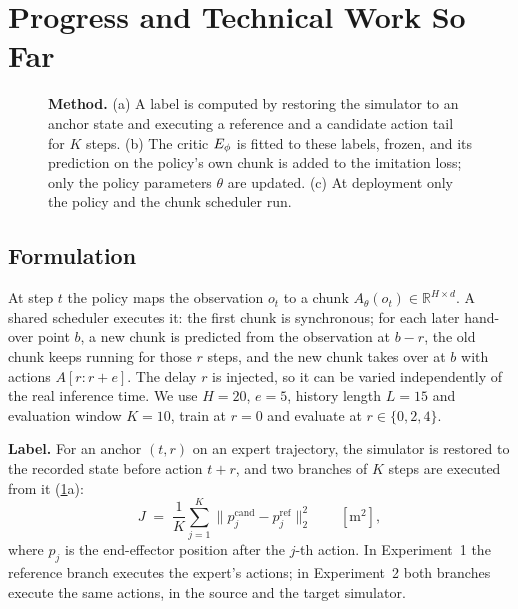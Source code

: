 \section{Progress and Technical Work So Far}

\begin{figure}[t]
  \centering
  \caption{\textbf{Method.} (a) A label is computed by restoring the simulator to an anchor state and executing a reference and a candidate action tail for $K$ steps. (b) The critic $E_\phi$ is fitted to these labels, frozen, and its prediction on the policy's own chunk is added to the imitation loss; only the policy parameters $\theta$ are updated. (c) At deployment only the policy and the chunk scheduler run.}
  \label{fig:method}
\end{figure}

\subsection{Formulation}
\label{sec:formulation}

At step $t$ the policy maps the observation $o_t$ to a chunk $A_\theta(o_t)\in\mathbb{R}^{H\times d}$. A shared scheduler executes it: the first chunk is synchronous; for each later hand-over point $b$, a new chunk is predicted from the observation at $b-r$, the old chunk keeps running for those $r$ steps, and the new chunk takes over at $b$ with actions $A[r{:}r{+}e]$. The delay $r$ is injected, so it can be varied independently of the real inference time. We use $H=20$, $e=5$, history length $L=15$ and evaluation window $K=10$, train at $r=0$ and evaluate at $r\in\{0,2,4\}$.

\textbf{Label.} For an anchor $(t,r)$ on an expert trajectory, the simulator is restored to the recorded state before action $t+r$, and two branches of $K$ steps are executed from it (\cref{fig:method}a):
\begin{equation}
J \;=\; \frac{1}{K}\sum_{j=1}^{K}\bigl\lVert p^{\mathrm{cand}}_{j}-p^{\mathrm{ref}}_{j}\bigr\rVert_2^2 \qquad [\mathrm{m}^2],
\label{eq:label}
\end{equation}
where $p_j$ is the end-effector position after the $j$-th action. In Experiment~1 the reference branch executes the expert's actions; in Experiment~2 both branches execute the same actions, in the source and the target simulator.

